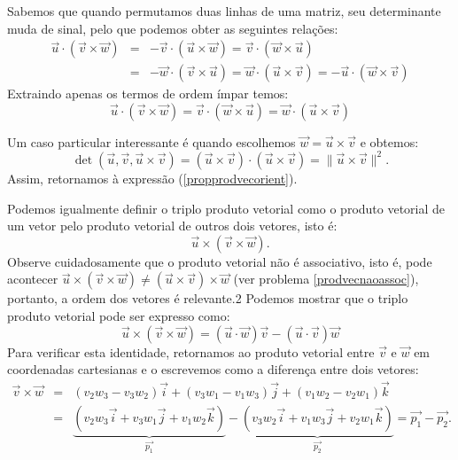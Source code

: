 Sabemos que quando permutamos duas linhas de uma matriz, seu determinante muda de sinal, pelo que podemos obter as seguintes relações:
\begin{eqnarray*}
\vec{u}\cdot\left(\vec{v}\times\vec{w}\right)&=&-\vec{v}\cdot\left(\vec{u}\times\vec{w}\right)=\vec{v}\cdot\left(\vec{w}\times\vec{u}\right)\\
&=&-\vec{w}\cdot\left(\vec{v}\times\vec{u}\right)=\vec{w}\cdot\left(\vec{u}\times\vec{v}\right)=-\vec{u}\cdot\left(\vec{w}\times\vec{v}\right)
\end{eqnarray*}
Extraindo apenas os termos de ordem ímpar temos:
\begin{equation}\label{triploprodutoescalar} \vec{u}\cdot\left(\vec{v}\times\vec{w}\right)=\vec{v}\cdot\left(\vec{w}\times\vec{u}\right)=\vec{w}\cdot\left(\vec{u}\times\vec{v}\right)
\end{equation}
\begin{obs} Um caso particular interessante é quando escolhemos $\vec{w}=\vec{u}\times\vec{v}$ e obtemos:
\begin{equation*}
\det\left(\vec{u},\vec{v},\vec{u}\times\vec{v}\right)=\left(\vec{u}\times\vec{v}\right)\cdot\left(\vec{u}\times\vec{v}\right)=\|\vec{u}\times\vec{v}\|^2.
\end{equation*}
Assim, retornamos à expressão (\ref{propprodvecorient}).
\end{obs}

Podemos igualmente definir o triplo produto vetorial como o produto vetorial de um vetor pelo produto vetorial de outros dois vetores, isto é:
$$\vec{u}\times \left(\vec{v}\times\vec{w}\right). $$
Observe cuidadosamente que o produto vetorial não é associativo, isto é, pode acontecer $\vec{u}\times \left(\vec{v}\times\vec{w}\right)\neq \left(\vec{u}\times \vec{v}\right)\times\vec{w} $ (ver problema \ref{prodvecnaoassoc}), portanto, a ordem dos vetores é relevante.2
Podemos mostrar que o triplo produto vetorial pode ser expresso como:
\begin{equation*}
\vec{u}\times\left(\vec{v}\times\vec{w}\right)=\left(\vec{u}\cdot\vec{w}\right)\vec{v}-\left(\vec{u}\cdot\vec{v}\right)\vec{w}
\end{equation*}
Para verificar esta identidade, retornamos ao produto vetorial entre $\vec{v}$ e $\vec{w}$ em coordenadas cartesianas e o escrevemos como a diferença entre dois vetores:
\begin{eqnarray*} \vec{v}\times\vec{w}&=&\left(v_2w_3-v_3w_2\right)\vec{i}+\left(v_3w_1-v_1w_3\right)\vec{j}+\left(v_1w_2-v_2w_1\right)\vec{k}\\
&=& \underbrace{\left(v_2w_3\vec{i}+v_3w_1\vec{j}+v_1w_2\vec{k}\right)}_{\vec{p_1}} -\underbrace{\left(v_3w_2\vec{i}+v_1w_3\vec{j}+v_2w_1\vec{k}\right)}_{\vec{p_2}}=\vec{p_1}-\vec{p_2}.
\end{eqnarray*}


